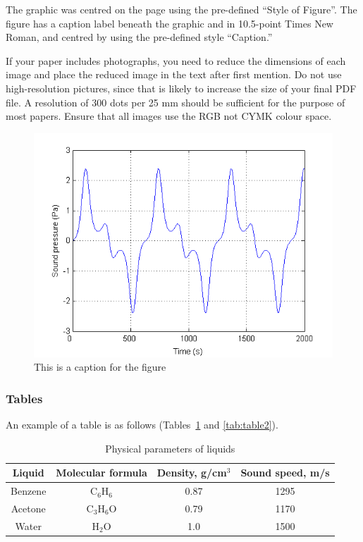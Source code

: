 The graphic was centred on the page using the pre-defined ``Style of Figure''. The figure has a caption label beneath the graphic and in 10.5-point Times New Roman, and centred by using the pre-defined style ``Caption.''

If your paper includes photographs, you need to reduce the dimensions of each image and place the reduced image in the text after first mention. Do not use high-resolution pictures, since that is likely to increase the size of your final PDF file. A resolution of 300 dots per 25 mm should be sufficient for the purpose of most papers. Ensure that all images use the RGB not CYMK colour space.

\begin{figure}[H]
\centering
\includegraphics[width=0.75\linewidth]{fig/figure1.png}
\caption{This is a caption for the figure}
\label{fig:figure1}
\end{figure}

\subsubsection{Tables}

An example of a table is as follows (Tables~\ref{tab:table1} and \ref{tab:table2}).

\begin{table}[!ht]
\caption{Physical parameters of liquids}
\label{tab:table1}
\centering \renewcommand{\arraystretch}{2}
\begin{tabular}{cccc}
\hline 
Liquid & Molecular formula & Density, g/cm$^3$ & Sound speed, m/s \\ \hline
Benzene	& C$_6$H$_6$ &	0.87 & 1295\\
Acetone &	C$_3$H$_6$O &	0.79 &1170\\
Water	& H$_2$O & 1.0 & 1500\\ \hline
\end{tabular} 
\end{table}

